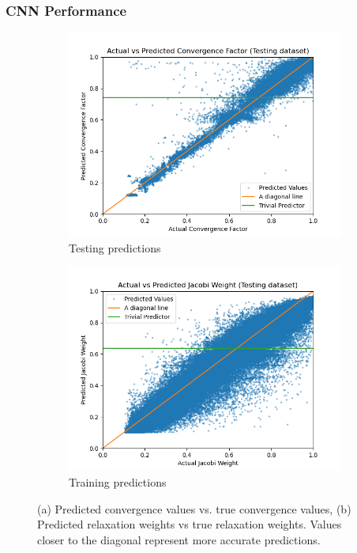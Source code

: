 \documentclass[handout]{beamer}
\begin{document}
\begin{frame}
  \frametitle{CNN Performance}
  \begin{figure}[h]
  \centering
  \begin{subfigure}{.48\textwidth}
    \includegraphics[width=\textwidth]{figures/poisson_conv_test_pred.png}
    \caption{Testing predictions}
  \end{subfigure}
  \begin{subfigure}{.48\textwidth}
    \includegraphics[width=\textwidth]{figures/poisson_jacobi_test_pred.png}
    \caption{Training predictions}
  \end{subfigure}
  \caption{(a) Predicted convergence values vs. true convergence values, (b) Predicted relaxation weights vs true relaxation weights.  Values closer to the diagonal represent more accurate predictions. }
  \label{fig:poisson_conv_pred}
\end{figure}
\end{frame}
\end{document}
